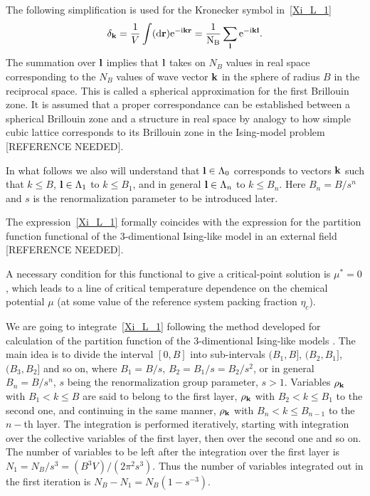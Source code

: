 The following simplification is used for the Kronecker symbol in~\eqref{Xi_L_1}
\begin{equation*}
	\delta_{\vb k} = \frac{1}{V} \int (\rm{d} \vb r) \rm{e}^{-{\rm i} \vb k \vb r} = \frac{1}{N_B}\sum_{\vb l} {\rm e}^{-{\rm i} \vb k \vb l}.
\end{equation*}
The summation over $\vb l$ implies that $\vb l$ takes on $N_B$ values in real space corresponding to the $N_B$ values of wave vector $\vb k$ in the sphere of radius $B$ in the reciprocal space. This is called a spherical approximation for the first Brillouin zone. It is assumed that a proper correspondance can be established between a spherical Brillouin zone and a structure in real space by analogy to how simple cubic lattice corresponds to its Brillouin zone in the Ising-model problem [REFERENCE NEEDED]. 

In what follows we also will understand that $\vb l \in \Lambda_0$ corresponds to vectors $\vb k$ such that $k \leq B$, $\vb l \in \Lambda_1$ to $k \leq B_1$, and in general $\vb l \in \Lambda_n$ to $k \leq B_n$. Here $B_n = B/s^n$ and $s$ is the renormalization parameter to be introduced later.

The expression~\eqref{Xi_L_1} formally coincides with the expression for the partition function functional of the 3-dimentional Ising-like model in an external field [REFERENCE NEEDED]. 

A necessary condition for this functional to give a critical-point solution is $\mu^* = 0$, which leads to a line of critical temperature dependence on the chemical potential $\mu$ (at some value of the reference system packing fraction $\eta_c$).

We are going to integrate~\eqref{Xi_L_1} following the method developed for calculation of the partition function of the 3-dimentional Ising-like models \cite{MpkCMP2005,Yukh1989riv}. The main idea is to divide the interval $[0, B]$ into sub-intervals $(B_1, B]$, $(B_2, B_1]$, $(B_3, B_2]$ and so on, where $B_1 = B/s$, $B_2 = B_1/s = B_2/s^2$, or in general $B_n = B/s^n$, $s$ being the renormalization group parameter, $s > 1.$ Variables $\rho_{\vb k}$ with $B_1 < k \leq B$ are said to belong to the first layer, $\rho_{\vb k}$ with $B_2 < k \leq B_1$ to the second one, and continuing in the same manner, $\rho_{\vb k}$ with $B_n < k \leq B_{n-1}$ to the $n-$th layer.
The integration is performed iteratively, starting with integration over the collective variables of the first layer, then over the second one and so on.
The number of variables to be left after the integration over the first layer is $N_1 = N_B / s^3 = (B^3 V)/(2\pi^2 s^3)$. Thus the number of variables integrated out in the first iteration is $N_B - N_1 = N_B(1-s^{-3})$.

